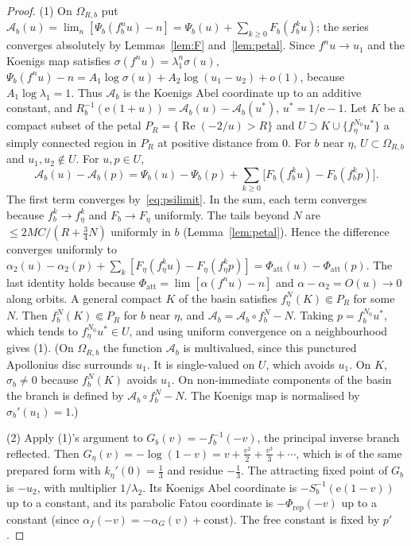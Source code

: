 \documentclass[11pt,a4paper]{article}
\theoremstyle{definition}
\newcommand{\Rr}{R}
\newcommand{\eee}{\mathrm{e}}
\begin{document}
\begin{proof}
(1) On $\Omega_{R,b}$ put
$\mathcal A_b(u)=\lim_n[\Psi_b(f_b^nu)-n]=\Psi_b(u)+\sum_{k\ge0}F_b(f_b^ku)$;
the series converges absolutely by Lemmas~\ref{lem:F} and~\ref{lem:petal}.
Since $f^nu\to u_1$ and the Koenigs map satisfies
$\sigma(f^nu)=\lambda_1^n\sigma(u)$,
$\Psi_b(f^nu)-n=A_1\log\sigma(u)+A_2\log(u_1-u_2)+o(1)$, because
$A_1\log\lambda_1=1$.  Thus $\mathcal A_b$ is the Koenigs Abel coordinate up to
an additive constant, and
$\Rr_b^{-1}(\eee(1+u))=\mathcal A_b(u)-\mathcal A_b(u^*)$, $u^*=1/\eee-1$.
Let $K$ be a compact subset of the petal
$P_R=\{\operatorname{Re}(-2/u)>R\}$ and $U\supset K\cup\{f_\eta^{N_0}u^*\}$ a
simply connected region in $P_R$ at positive distance from $0$.  For $b$ near
$\eta$, $U\subset\Omega_{R,b}$ and $u_1,u_2\notin U$.  For $u,p\in U$,
\[
 \mathcal A_b(u)-\mathcal A_b(p)=\Psi_b(u)-\Psi_b(p)
 +\sum_{k\ge0}\bigl[F_b(f_b^ku)-F_b(f_b^kp)\bigr].
\]
The first term converges by~\eqref{eq:psilimit}.  In the sum, each term
converges because $f_b^k\to f_\eta^k$ and $F_b\to F_\eta$ uniformly.  The tails
beyond $N$ are $\le 2MC/(R+\tfrac34N)$ uniformly in $b$ (Lemma~\ref{lem:petal}).
Hence the difference converges uniformly to
$\alpha_2(u)-\alpha_2(p)+\sum_k[F_\eta(f_\eta^ku)-F_\eta(f_\eta^kp)]
 =\Phi_{\mathrm{att}}(u)-\Phi_{\mathrm{att}}(p)$.  The last identity holds
because $\Phi_{\mathrm{att}}=\lim[\alpha(f^nu)-n]$ and
$\alpha-\alpha_2=O(u)\to0$ along orbits.  A general compact $K$ of the basin
satisfies $f_\eta^{N}(K)\Subset P_R$ for some $N$.  Then
$f_b^N(K)\Subset P_R$ for $b$ near $\eta$, and
$\mathcal A_b=\mathcal A_b\circ f_b^N-N$.  Taking $p=f_b^{N_0}u^*$, which
tends to $f_\eta^{N_0}u^*\in U$, and using uniform convergence on a
neighbourhood gives (1).  (On $\Omega_{R,b}$ the function $\mathcal A_b$ is
multivalued, since this punctured Apollonius disc surrounds $u_1$.
It is single-valued on $U$, which
avoids $u_1$.  On $K$, $\sigma_b\ne0$ because $f_b^N(K)$ avoids $u_1$.  On
non-immediate components of the basin the branch is defined by
$\mathcal A_b\circ f_b^N-N$.  The Koenigs map is normalised by
$\sigma_b'(u_1)=1$.)

(2) Apply (1)'s argument to $G_b(v)=-f_b^{-1}(-v)$, the principal inverse
branch reflected.  Then $G_\eta(v)=-\log(1-v)=v+\tfrac{v^2}2+\tfrac{v^3}3+\cdots$,
which is of the same prepared form with $k_\eta'(0)=\tfrac13$ and residue
$-\tfrac13$.  The attracting fixed point of $G_b$ is $-u_2$, with multiplier
$1/\lambda_2$.  Its Koenigs Abel coordinate is $-S_b^{-1}(\eee(1-v))$ up to a
constant, and its parabolic Fatou coordinate is $-\Phi_{\mathrm{rep}}(-v)$ up
to a constant (since $\alpha_{f}(-v)=-\alpha_{G}(v)+\text{const}$).  The free
constant is fixed by $p'$.
\end{proof}
\end{document}
